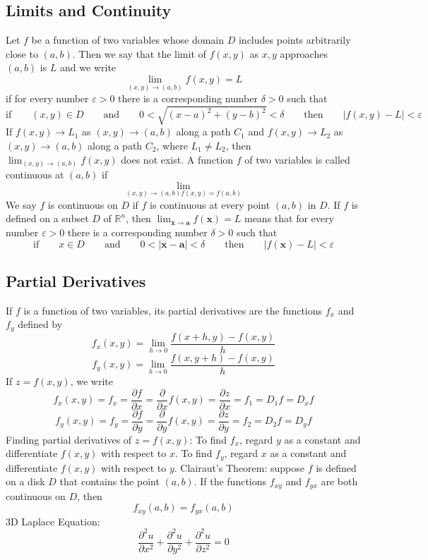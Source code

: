 \documentclass{article}
\begin{document}
    \subsection{Limits and Continuity}
    \begin{outline}
        \1 Let $f$ be a function of two variables whose domain $D$ includes points arbitrarily close to \((a,b)\). Then we say that the limit of \(f(x,y)\) as \(x,y\) approaches \((a,b)\) is $L$ and we write \[\lim_{(x,y)\to(a,b)}f(x,y)=L\] if for every number \(\varepsilon>0\) there is a corresponding number \(\delta>0\) such that \[\text{if}\qquad(x,y)\in D\qquad\text{and}\qquad 0<\sqrt{(x-a)^2+(y-b)^2}<\delta\qquad\text{then}\qquad|f(x,y)-L|<\varepsilon\]
        \1 If \(f(x,y)\to L_1\) as \((x,y)\to(a,b)\) along a path $C_1$ and \(f(x,y)\to L_2\) as \((x,y)\to(a,b)\) along a path $C_2$, where \(L_1\neq L_2\), then \(\lim_{(x,y)\to(a,b)}f(x,y)\) does not exist. 
        \1 A function $f$ of two variables is called continuous at \((a,b)\) if \[\lim_{(x,y)\to(a,b)f(x,y)=f(a,b)}\] We say $f$ is continuous on $D$ if $f$ is continuous at every point \((a,b)\) in $D$. 
        \1 If $f$ is defined on a subset $D$ of \(\mathbb{R}^n\), then \(\lim_{\mathbf x\to\mathbf a}f(\mathbf x)=L\) means that for every number \(\varepsilon>0\) there is a corresponding number \(\delta>0\) such that \[\text{if}\qquad x\in D\qquad\text{and}\qquad 0<|\mathbf x-\mathbf a|<\delta \qquad\text{then}\qquad |f(\mathbf x)-L|<\varepsilon\]
    \end{outline}
    \subsection{Partial Derivatives}
    \begin{outline}
        \1 If $f$ is a function of two variables, its partial derivatives are the functions $f_x$ and $f_y$ defined by \[f_x(x,y)=\lim_{h\to0}\dfrac{f(x+h,y)-f(x,y)}{h}\]\[f_y(x,y)=\lim_{h\to0}\dfrac{f(x,y+h)-f(x,y)}{h}\]
        \1 If \(z=f(x,y)\), we write \[f_x(x,y)=f_x=\dfrac{\partial f}{\partial x}=\dfrac{\partial}{\partial x}f(x,y)=\dfrac{\partial z}{\partial x}=f_1=D_1f=D_xf\]\[f_y(x,y)=f_y=\dfrac{\partial f}{\partial y}=\dfrac{\partial}{\partial y}f(x,y)=\dfrac{\partial z}{\partial y}=f_2=D_2f=D_yf\]
        \1 Finding partial derivatives of \(z=f(x,y)\):
            \2 To find $f_x$, regard $y$ as a constant and differentiate \(f(x,y)\) with respect to $x$. 
            \2 To find $f_y$, regard $x$ as a constant and differentiate \(f(x,y)\) with respect to $y$. 
        \1 Clairaut's Theorem: suppose $f$ is defined on a disk $D$ that contains the point \((a,b)\). If the functions \(f_{xy}\) and \(f_{yx}\) are both continuous on $D$, then \[f_{xy}(a,b)=f_{yx}(a,b)\]
        \1 3D Laplace Equation: \[\dfrac{\partial^2u}{\partial x^2}+\dfrac{\partial^2u}{\partial y^2}+\dfrac{\partial^2u}{\partial z^2}=0\]

    \end{outline}
\end{document}
